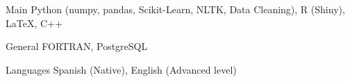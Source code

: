 

\begin{cvskills}


  \cvskill
    {Main} %
    {Python (numpy, pandas, Scikit-Learn, NLTK, Data Cleaning), R (Shiny), \LaTeX, C++}
  
 \cvskill
    {General} %
    {FORTRAN, PostgreSQL} %

  \cvskill
    {Languages} %
    {Spanish (Native), English (Advanced level)} %

\end{cvskills}
